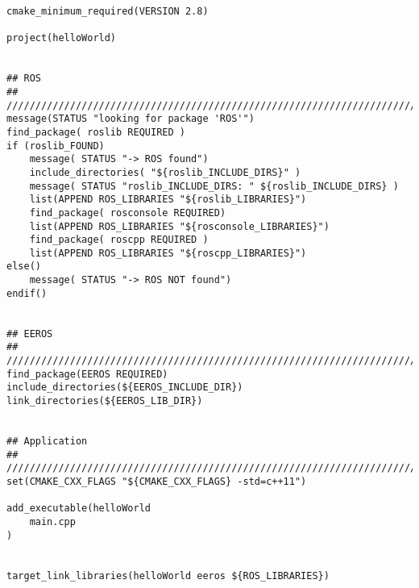 \lstset{language=c}
\begin{lstlisting}
cmake_minimum_required(VERSION 2.8)
 
project(helloWorld)


## ROS
## ////////////////////////////////////////////////////////////////////////
message(STATUS "looking for package 'ROS'")
find_package( roslib REQUIRED )
if (roslib_FOUND)
	message( STATUS "-> ROS found")
	include_directories( "${roslib_INCLUDE_DIRS}" )
	message( STATUS "roslib_INCLUDE_DIRS: " ${roslib_INCLUDE_DIRS} )
	list(APPEND ROS_LIBRARIES "${roslib_LIBRARIES}")
	find_package( rosconsole REQUIRED)
	list(APPEND ROS_LIBRARIES "${rosconsole_LIBRARIES}")
	find_package( roscpp REQUIRED )
	list(APPEND ROS_LIBRARIES "${roscpp_LIBRARIES}")
else()
	message( STATUS "-> ROS NOT found")
endif()


## EEROS
## ////////////////////////////////////////////////////////////////////////
find_package(EEROS REQUIRED)
include_directories(${EEROS_INCLUDE_DIR})
link_directories(${EEROS_LIB_DIR})


## Application
## ////////////////////////////////////////////////////////////////////////
set(CMAKE_CXX_FLAGS "${CMAKE_CXX_FLAGS} -std=c++11")
 
add_executable(helloWorld
	main.cpp	
)


target_link_libraries(helloWorld eeros ${ROS_LIBRARIES})

\end{lstlisting}
